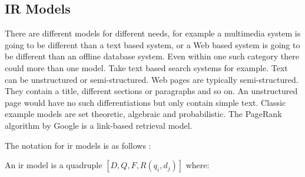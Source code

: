 


\subsection{IR Models}

\begin{comment}
  \gls{ir} models describe ranking algorithms formally. ???
\end{comment}

There are different models for different needs, for example a multimedia system is going to be different than a text based system, or a Web based system is going to be different than an offline database system. Even within one such category there could more than one model. Take text based search systems for example. Text can be unstructured or semi-structured. Web pages are typically semi-structured. They contain a title, different sections or paragraphs and so on. An unstructured page would have no such differentiations but only contain simple text.  Classic example models are set theoretic, algebraic and probabilistic. The PageRank algorithm by Google is a link-based retrieval model.

The notation for \gls{ir} models is as follows \autocite[adapted from][p.58]{Baeza-Yates2011}:

An \gls{ir} model is a quadruple $[D,Q,F,R(q_i, d_j)]$ where:\\
 \\
 \\
 \\
\itab{}    \\
            \\
 \\
            \\
\itab{}     



